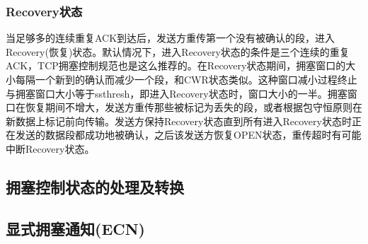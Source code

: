 		\subsubsection{Recovery状态}

			当足够多的连续重复ACK到达后，发送方重传第一个没有被确认的段，进入Recovery(恢复)状态。默认情况下，进入Recovery状态的条件是三个连续的重复ACK，TCP拥塞控制规范也是这么推荐的。在Recovery状态期间，拥塞窗口的大小每隔一个新到的确认而减少一个段，和CWR状态类似。这种窗口减小过程终止与拥塞窗口大小等于ssthresh，即进入Recovery状态时，窗口大小的一半。拥塞窗口在恢复期间不增大，发送方重传那些被标记为丢失的段，或者根据包守恒原则在新数据上标记前向传输。发送方保持Recovery状态直到所有进入Recovery状态时正在发送的数据段都成功地被确认，之后该发送方恢复OPEN状态，重传超时有可能中断Recovery状态。
	\subsection{拥塞控制状态的处理及转换}

	\subsection{显式拥塞通知(ECN)}


